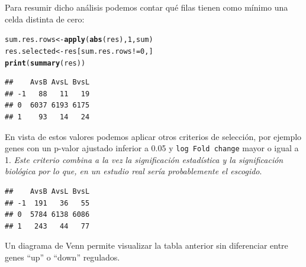 \documentclass[a4paper]{article}\usepackage[]{graphicx}\usepackage[]{color}
\makeatletter
\newcommand{\hlnum}[1]{\textcolor[rgb]{0.686,0.059,0.569}{#1}}%
\newcommand{\hlopt}[1]{\textcolor[rgb]{0,0,0}{#1}}%
\newcommand{\hlstd}[1]{\textcolor[rgb]{0.345,0.345,0.345}{#1}}%
\newcommand{\hlkwb}[1]{\textcolor[rgb]{0.69,0.353,0.396}{#1}}%
\newcommand{\hlkwd}[1]{\textcolor[rgb]{0.737,0.353,0.396}{\textbf{#1}}}%
\newenvironment{kframe}{%
 \def\at@end@of@kframe{}%
 \ifinner\ifhmode%
  \def\at@end@of@kframe{\end{minipage}}%
  \begin{minipage}{\columnwidth}%
 \fi\fi%
 \def\FrameCommand##1{\hskip\@totalleftmargin \hskip-\fboxsep
 \colorbox{shadecolor}{##1}\hskip-\fboxsep
     \hskip-\linewidth \hskip-\@totalleftmargin \hskip\columnwidth}%
 \MakeFramed {\advance\hsize-\width
   \@totalleftmargin\z@ \linewidth\hsize
   \@setminipage}}%
 {\par\unskip\endMakeFramed%
 \at@end@of@kframe}
\newenvironment{knitrout}{}{} %
\makeatother
\begin{document}
Para resumir dicho análisis podemos contar qué filas tienen como mínimo una celda distinta de cero:

\begin{knitrout}
\color{fgcolor}\begin{kframe}
\begin{alltt}
\hlstd{sum.res.rows}\hlkwb{<-}\hlkwd{apply}\hlstd{(}\hlkwd{abs}\hlstd{(res),}\hlnum{1}\hlstd{,sum)}
\hlstd{res.selected}\hlkwb{<-}\hlstd{res[sum.res.rows}\hlopt{!=}\hlnum{0}\hlstd{,]}
\hlkwd{print}\hlstd{(}\hlkwd{summary}\hlstd{(res))}
\end{alltt}
\begin{verbatim}
##    AvsB AvsL BvsL
## -1   88   11   19
## 0  6037 6193 6175
## 1    93   14   24
\end{verbatim}
\end{kframe}
\end{knitrout}

En vista de estos valores podemos aplicar otros criterios de selección, por ejemplo genes con un p-valor ajustado inferior a 0.05 y \texttt{log Fold change} mayor o igual a 1.\emph{ Este criterio combina a la vez la significación estadística y la significación biológica por lo que, en un estudio real sería probablemente el escogido}.

\begin{knitrout}
\color{fgcolor}\begin{kframe}
\begin{verbatim}
##    AvsB AvsL BvsL
## -1  191   36   55
## 0  5784 6138 6086
## 1   243   44   77
\end{verbatim}
\end{kframe}
\end{knitrout}

Un diagrama de Venn permite visualizar la tabla anterior sin diferenciar entre genes ``up'' o ``down'' regulados.
\end{document}
